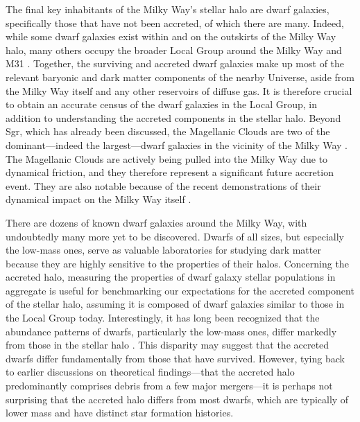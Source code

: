 The final key inhabitants of the Milky Way's stellar halo are dwarf galaxies, specifically those that have not been accreted, of which there are many. Indeed, while some dwarf galaxies exist within and on the outskirts of the Milky Way halo, many others occupy the broader Local Group around the Milky Way and M31 \parencite[for reviews and compendiums see][]{tolstoy09,mcconnachie12,simon19}. Together, the surviving and accreted dwarf galaxies make up most of the relevant baryonic and dark matter components of the nearby Universe, aside from the Milky Way itself and any other reservoirs of diffuse gas. It is therefore crucial to obtain an accurate census of the dwarf galaxies in the Local Group, in addition to understanding the accreted components in the stellar halo. Beyond Sgr, which has already been discussed, the Magellanic Clouds are two of the dominant---indeed the largest---dwarf galaxies in the vicinity of the Milky Way \parencite[they are essentially a field of study unto themselves; see][]{westerlund97}. The Magellanic Clouds are actively being pulled into the Milky Way due to dynamical friction, and they therefore represent a significant future accretion event. They are also notable because of the recent demonstrations of their dynamical impact on the Milky Way itself \parencite{erkal19,garavitocamargo19}.

There are dozens of known dwarf galaxies around the Milky Way, with undoubtedly many more yet to be discovered. Dwarfs of all sizes, but especially the low-mass ones, serve as valuable laboratories for studying dark matter \parencite[][]{bullock17,simon19,sales22} because they are highly sensitive to the properties of their halos. Concerning the accreted halo, measuring the properties of dwarf galaxy stellar populations in aggregate is useful for benchmarking our expectations for the accreted component of the stellar halo, assuming it is composed of dwarf galaxies similar to those in the Local Group today. Interestingly, it has long been recognized that the abundance patterns of dwarfs, particularly the low-mass ones, differ markedly from those in the stellar halo \parencite[e.g.][]{tolstoy03,venn04}. This disparity may suggest that the accreted dwarfs differ fundamentally from those that have survived. However, tying back to earlier discussions on theoretical findings---that the accreted halo predominantly comprises debris from a few major mergers---it is perhaps not surprising that the accreted halo differs from most dwarfs, which are typically of lower mass and have distinct star formation histories.

